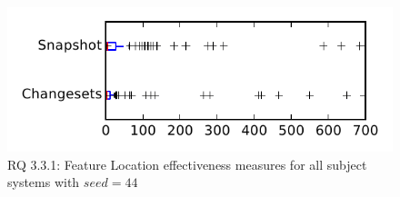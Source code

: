 
\begin{figure}
\centering
\includegraphics[height=0.4\textheight]{figures/flt_seed/rq1_tiny_44}
\caption{RQ 3.3.1: Feature Location effectiveness measures for all subject systems with $seed=44$}
\label{fig:flt_seed:rq1:tiny}
\end{figure}
